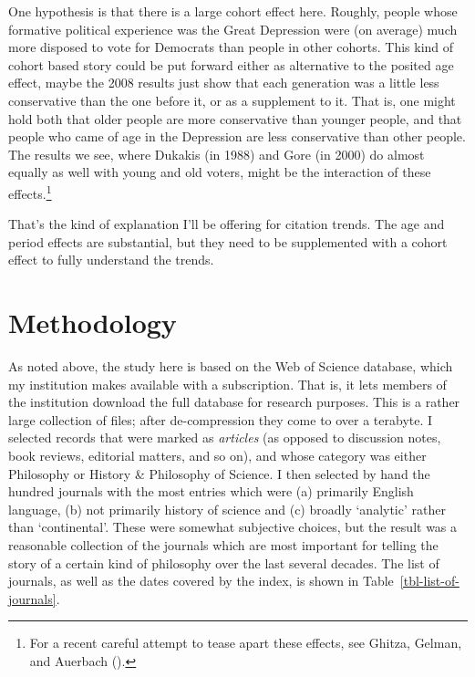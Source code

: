 \documentclass[
  11pt,
  letterpaper,
  DIV=11,
  numbers=noendperiod,
  twoside]{scrartcl}
\begin{document}
One hypothesis is that there is a large cohort effect here. Roughly,
people whose formative political experience was the Great Depression
were (on average) much more disposed to vote for Democrats than people
in other cohorts. This kind of cohort based story could be put forward
either as alternative to the posited age effect, maybe the 2008 results
just show that each generation was a little less conservative than the
one before it, or as a supplement to it. That is, one might hold both
that older people are more conservative than younger people, and that
people who came of age in the Depression are less conservative than
other people. The results we see, where Dukakis (in 1988) and Gore (in
2000) do almost equally as well with young and old voters, might be the
interaction of these effects.\footnote{For a recent careful attempt to
  tease apart these effects, see Ghitza, Gelman, and Auerbach
  ().}

That's the kind of explanation I'll be offering for citation trends. The
age and period effects are substantial, but they need to be supplemented
with a cohort effect to fully understand the trends.

\section{Methodology}\label{sec-methodology}

As noted above, the study here is based on the Web of Science database,
which my institution makes available with a subscription. That is, it
lets members of the institution download the full database for research
purposes. This is a rather large collection of files; after
de-compression they come to over a terabyte. I selected records that
were marked as \emph{articles} (as opposed to discussion notes, book
reviews, editorial matters, and so on), and whose category was either
Philosophy or History \& Philosophy of Science. I then selected by hand
the hundred journals with the most entries which were (a) primarily
English language, (b) not primarily history of science and (c) broadly
`analytic' rather than `continental'. These were somewhat subjective
choices, but the result was a reasonable collection of the journals
which are most important for telling the story of a certain kind of
philosophy over the last several decades. The list of journals, as well
as the dates covered by the index, is shown in
Table~\ref{tbl-list-of-journals}.
\end{document}
